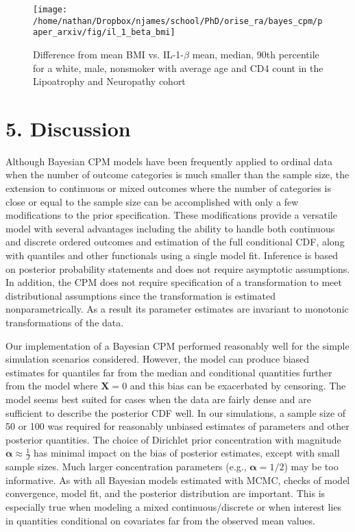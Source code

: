 \documentclass[
]{article}
\begin{document}
\begin{figure}

{\centering \texttt{[image: /home/nathan/Dropbox/njames/school/PhD/orise\_ra/bayes\_cpm/paper\_arxiv/fig/il\_1\_beta\_bmi]} 

}

\caption{Difference from mean BMI vs. IL-1-$\beta$ mean, median, 90th percentile for a white, male, nonsmoker with average age and CD4 count in the Lipoatrophy and Neuropathy cohort}\label{fig:il-1-beta-bmi}
\end{figure}

\hypertarget{discussion}{%
\section{5. Discussion}\label{discussion}}

Although Bayesian CPM models have been frequently applied to ordinal data when the number of outcome categories is much smaller than the sample size, the extension to continuous or mixed outcomes where the number of categories is close or equal to the sample size can be accomplished with only a few modifications to the prior specification. These modifications provide a versatile model with several advantages including the ability to handle both continuous and discrete ordered outcomes and estimation of the full conditional CDF, along with quantiles and other functionals using a single model fit. Inference is based on posterior probability statements and does not require asymptotic assumptions. In addition, the CPM does not require specification of a transformation to meet distributional assumptions since the transformation is estimated nonparametrically. As a result its parameter estimates are invariant to monotonic transformations of the data.

Our implementation of a Bayesian CPM performed reasonably well for the simple simulation scenarios considered. However, the model can produce biased estimates
for quantiles far from the median and conditional quantities further from the model where \(\boldsymbol{X}=0\) and this bias can be exacerbated by censoring.
The model seems best suited for cases when the data are fairly dense and are sufficient to describe the posterior CDF well. In our simulations, a sample size of 50 or 100 was required for reasonably unbiased estimates of parameters and other posterior quantities. The choice of Dirichlet prior concentration with magnitude \(\boldsymbol{\alpha} \approx \frac{1}{J}\) has minimal impact on the bias of posterior estimates, except with small sample sizes. Much larger concentration parameters (e.g., \(\boldsymbol{\alpha}=1/2\)) may be too informative. As with all Bayesian models estimated with MCMC, checks of model convergence, model fit, and the posterior distribution are important. This is especially true when modeling a mixed continuous/discrete or when interest lies in quantities conditional on covariates far from the observed mean values.
\end{document}
